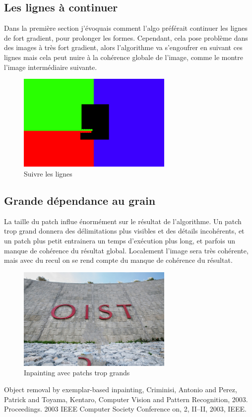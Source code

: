 \subsection{Les lignes à continuer}
Dans la première section j'évoquais comment l'algo préférait continuer les lignes de fort
gradient, pour prolonger les formes. Cependant, cela pose problème dans des images
à très fort gradient, alors l'algorithme va s'engoufrer en suivant ces lignes mais cela
peut nuire à la cohérence globale de l'image, comme le montre l'image intermédiaire suivante.

\begin{figure}[ht]
\centering
\includegraphics[width=7.5cm]{img/examples/line.jpg}
\caption{Suivre les lignes}
\end{figure}

\subsection{Grande dépendance au grain}
La taille du patch influe énormément sur le résultat de l'algorithme. Un patch trop grand
donnera des délimitations plus visibles et des détails incohérents, et un patch plus 
petit entrainera un temps d'exécution plus long, et parfois un manque de cohérence du 
résultat global. Localement l'image sera très cohérente, mais avec du recul on se rend 
compte du manque de cohérence du résultat.

\begin{figure}[ht]
\centering
\includegraphics[width=7.5cm]{img/examples/big_patch.jpg}
\caption{Inpainting avec patchs trop grands}
\end{figure}



\begin{thebibliography}{9}
  Object removal by exemplar-based inpainting,
  Criminisi, Antonio and Perez, Patrick and Toyama, Kentaro,
  Computer Vision and Pattern Recognition, 2003. Proceedings. 2003 IEEE Computer Society Conference on,
  2,
  II--II,
  2003,
  IEEE.

\end{thebibliography}


